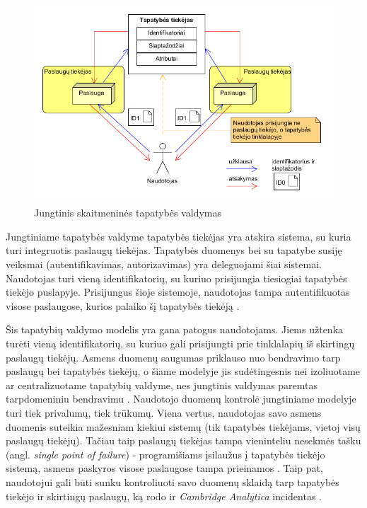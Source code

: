 \begin{figure}[H]
    \centering
    \includegraphics[scale=0.75]{img/federatedModel}
    \caption{Jungtinis skaitmeninės tapatybės valdymas \cite{Cao2010}}
    \label{fig:federatedModel}
\end{figure}

Jungtiniame tapatybės valdyme tapatybės tiekėjas yra atskira sistema, su kuria turi integruotis paslaugų tiekėjas. Tapatybės
duomenys bei su tapatybe susiję veiksmai (autentifikavimas, autorizavimas) yra deleguojami šiai sistemai. Naudotojas turi vieną identifikatorių,
su kuriuo prisijungia tiesiogiai tapatybės tiekėjo puslapyje. Prisijungus šioje sistemoje, naudotojas tampa
autentifikuotas visose paslaugose, kurios palaiko šį tapatybės tiekėją \cite{Maler2008}.

Šis tapatybių valdymo modelis yra gana patogus naudotojams. Jiems užtenka turėti vieną identifikatorių, su kuriuo
gali prisijungti prie tinklalapių iš skirtingų paslaugų tiekėjų. Asmens duomenų saugumas priklauso nuo
bendravimo tarp paslaugų bei tapatybės tiekėjų, o šiame modelyje jis sudėtingesnis nei izoliuotame ar centralizuotame
tapatybių valdyme, nes jungtinis valdymas paremtas tarpdomeniniu bendravimu \cite{Maler2008}. Naudotojo duomenų kontrolė jungtiniame 
modelyje turi tiek privalumų, tiek trūkumų. Viena vertus, naudotojas savo asmens duomenis suteikia mažesniam kiekiui sistemų (tik tapatybės tiekėjams,
vietoj visų paslaugų tiekėjų). Tačiau taip paslaugų tiekėjas tampa vieninteliu nesekmės tašku (angl. \textit{single point of failure}) - programišiams įsilaužus
į tapatybės tiekėjo sistemą, asmens paskyros visose paslaugose tampa prieinamos \cite{Pashalidis2003}. Taip pat, naudotojui gali būti sunku kontroliuoti
savo duomenų sklaidą tarp tapatybės tiekėjo ir skirtingų paslaugų, ką rodo ir \textit{Cambridge Analytica} incidentas \cite{CambridgeAnalytica}.

